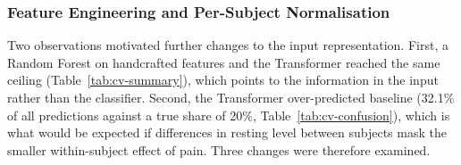%
%
%
%
%

\subsubsection{Feature Engineering and Per-Subject Normalisation}

Two observations motivated further changes to the input representation. First, a Random Forest on handcrafted features and the Transformer reached the same ceiling (Table~\ref{tab:cv-summary}), which points to the information in the input rather than the classifier. Second, the Transformer over-predicted baseline (32.1\% of all predictions against a true share of 20\%, Table~\ref{tab:cv-confusion}), which is what would be expected if differences in resting level between subjects mask the smaller within-subject effect of pain. Three changes were therefore examined.

